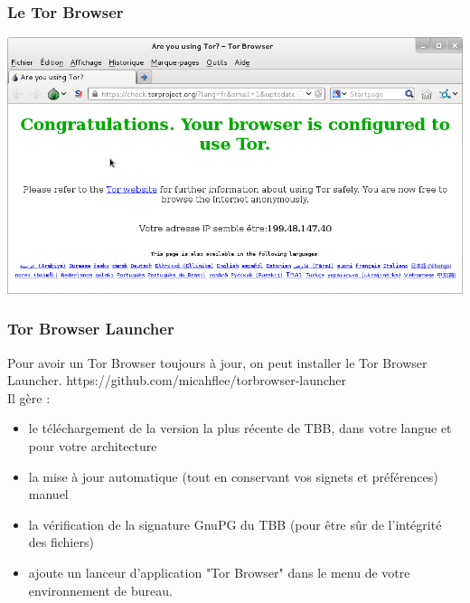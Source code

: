 \documentclass{beamer}
\begin{document}
\begin{frame}
\frametitle{Le Tor Browser}
\begin{center}
\includegraphics[keepaspectratio,width=\textwidth, height=.8\textheight]{images/tbb}
\end{center}
\end{frame}

\begin{frame}
\frametitle{Tor Browser Launcher}
Pour avoir un Tor Browser toujours à jour, on peut installer le Tor Browser Launcher.
https://github.com/micahflee/torbrowser-launcher
\\
Il gère : 
\begin{itemize}
\item le téléchargement de la version la plus récente de TBB, dans votre langue et pour votre architecture
\item la mise à jour automatique (tout en conservant vos signets et préférences) manuel
\item la vérification de la signature GnuPG du TBB (pour être sûr de l’intégrité des fichiers)
\item ajoute un lanceur d’application "Tor Browser" dans le menu de votre environnement de bureau.
\end{itemize}
\end{frame}
\end{document}
